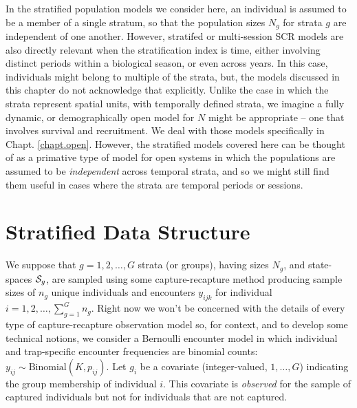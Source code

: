 In the stratified population models we consider here, an individual is
assumed to be a member of a single stratum, so that the population
sizes $N_{g}$ for strata $g$ are independent of one another. However,
stratifed or multi-session SCR models are also directly relevant when
the stratification index is time, either involving distinct periods within
a biological season, or even across years. In this case, individuals
might belong to multiple of the strata, but, the models discussed in
this chapter do not acknowledge that explicitly.
Unlike the case in which the strata represent spatial units, with
temporally defined strata, we imagine a fully dynamic, or
demographically open model for $N$ might be appropriate -- one that
involves survival and recruitment. We deal with those models
specifically in Chapt. \ref{chapt.open}.  However, the stratified
models covered here can be thought of as a primative type of model for
open systems in which the populations are assumed to be {\it
  independent} across temporal strata, and so we might still find them
useful in cases where the strata are temporal periods or sessions.

\section{Stratified Data Structure}


We suppose that $g=1,2,\ldots,G$ strata (or groups), having sizes $N_{g}$,
and state-spaces ${\cal S}_{g}$, are sampled using some capture-recapture
method producing sample sizes of $n_{g}$ unique individuals and
encounters $y_{ijk}$ for individual $i=1,2,\ldots, \sum_{g=1}^{G}
n_{g}$.  Right now we won't be concerned with the details of every
type of capture-recapture observation model so, for context, and to
develop some technical notions, we
consider a Bernoulli encounter model in which individual and trap-specific
encounter frequencies are binomial counts: $y_{ij} \sim
\mbox{Binomial}(K,p_{ij})$.  Let $g_{i}$ be a covariate
(integer-valued, $1, \ldots, G$) indicating the group membership
of individual $i$. This covariate is {\it observed} for the sample of
captured individuals but not for individuals that are not captured.

